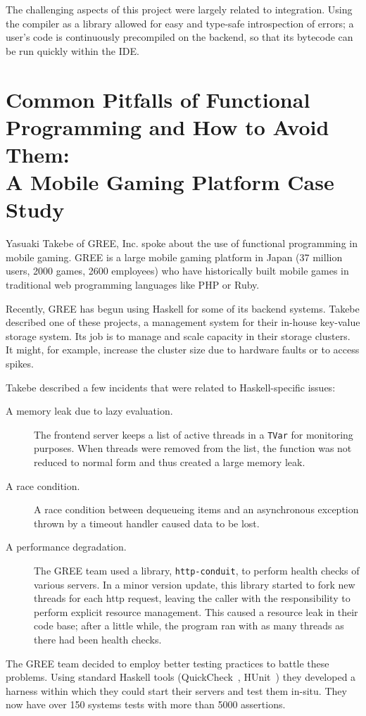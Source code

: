 \documentclass{jfp1}
\begin{document}
The challenging aspects of this project were largely related
to integration. Using the compiler as a library allowed for easy
and type-safe introspection of errors; a user's code is continuously
precompiled on the backend, so that its bytecode can be run
quickly within the IDE.

\section{Common Pitfalls of Functional Programming and How 
to Avoid Them:\\ A Mobile Gaming Platform Case Study}


Yasuaki Takebe of GREE, Inc. spoke about the use of functional
programming in mobile gaming. GREE is a large mobile gaming
platform in Japan (37 million users, 2000 games, 
2600 employees) who have historically built mobile games in
traditional web programming languages like PHP or Ruby.

Recently, GREE has begun using Haskell for some of its backend
systems. Takebe described one of these projects, a management system
for their in-house key-value storage system. Its job is to manage and
scale capacity in their storage clusters. It might, for example,
increase the cluster size due to hardware faults or to access spikes.

Takebe described a few incidents that were related to Haskell-specific
issues:

\begin{description}

\item[A memory leak due to lazy evaluation.] The frontend
server keeps a list of active threads in a \texttt{TVar} for
monitoring purposes. When threads were removed from the list, the
function was not reduced to normal form and thus created a large
memory leak.

\item[A race condition.] A race condition between dequeueing
items and an asynchronous exception thrown by a timeout handler caused
data to be lost. 

\item[A performance degradation.] The GREE team used a
library, \texttt{http-conduit}, to perform health checks of various
servers. In a minor version update, this library started to fork new
threads for each http request, leaving the caller with the
responsibility to perform explicit resource management. This caused
a resource leak in their code base; after a little while, the program ran
with as many threads as there had been health checks.
\end{description}
The GREE team 
decided to employ better testing practices to battle these problems. Using standard Haskell
tools (QuickCheck~\cite{Claessen:2011:Quickcheck},
HUnit~\cite{Herington:2014:HUnit}) they developed a harness within
which they could start their servers and test them in-situ. They now
have over 150 systems tests with more than 5000 assertions.
\end{document}
